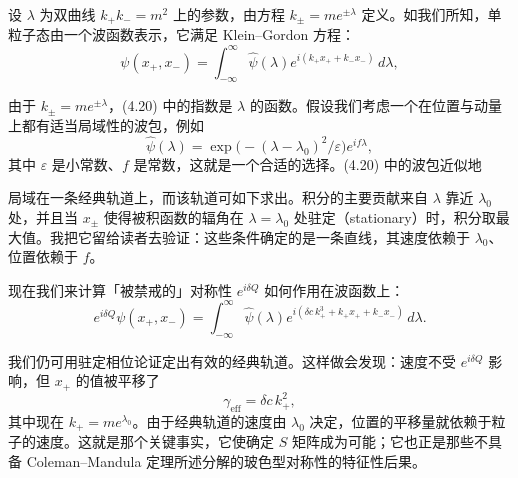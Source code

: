 设 $\lambda$ 为双曲线 $k_+k_-=m^2$ 上的参数，由方程 $k_\pm=me^{\pm\lambda}$ 定义。如我们所知，单粒子态由一个波函数表示，它满足 Klein–Gordon 方程：
\begin{equation}
  \tag{4.20}
  \label{eq:4-20}
  \psi(x_+,x_-)=\int_{-\infty}^{\infty}\widehat{\psi}(\lambda)e^{i(k_+x_++k_-x_-)}\,d\lambda,
\end{equation}

由于 $k_\pm=me^{\pm\lambda}$，(4.20) 中的指数是 $\lambda$ 的函数。假设我们考虑一个在位置与动量上都有适当局域性的波包，例如
\[
\widehat{\psi}(\lambda)=\exp\bigl(-(\lambda-\lambda_0)^2/\varepsilon\bigr)e^{if\lambda},
\]
其中 $\varepsilon$ 是小常数、$f$ 是常数，这就是一个合适的选择。(4.20) 中的波包近似地

局域在一条经典轨道上，而该轨道可如下求出。积分的主要贡献来自 $\lambda$ 靠近 $\lambda_0$ 处，并且当 $x_\pm$ 使得被积函数的辐角在 $\lambda=\lambda_0$ 处驻定（stationary）时，积分取最大值。我把它留给读者去验证：这些条件确定的是一条直线，其速度依赖于 $\lambda_0$、位置依赖于 $f$。


现在我们来计算「被禁戒的」对称性 $e^{i\delta Q}$ 如何作用在波函数上：
\begin{equation}
  \tag{4.21}
  \label{eq:4-21}
  e^{i\delta Q}\psi(x_+,x_-)=\int_{-\infty}^{\infty}\widehat{\psi}(\lambda)e^{i(\delta c\,k_+^3+k_+x_++k_-x_-)}\,d\lambda .
\end{equation}

我们仍可用驻定相位论证定出有效的经典轨道。这样做会发现：速度不受 $e^{i\delta Q}$ 影响，但 $x_+$ 的值被平移了
\[
\gamma_{\mathrm{eff}}=\delta c\,k_+^2,
\]
其中现在 $k_+=me^{\lambda_0}$。由于经典轨道的速度由 $\lambda_0$ 决定，位置的平移量就依赖于粒子的速度。这就是那个关键事实，它使确定 $S$ 矩阵成为可能；它也正是那些不具备 Coleman–Mandula 定理所述分解的玻色型对称性的特征性后果。


